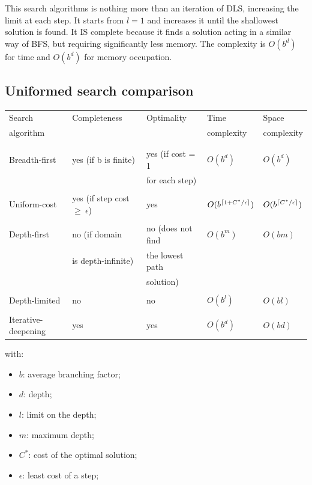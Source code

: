 \documentclass{article}
\DeclarePairedDelimiter\ceil{\lceil}{\rceil}
\begin{document}
This search algorithms is nothing more than an iteration of DLS, increasing the limit at each step. It starts from $l=1$ and increases it until the shallowest solution is found. It IS complete because it finds a solution acting in a similar way of BFS, but requiring significantly less memory. The complexity is $O(b^d)$ for time and $O(b^d)$ for memory occupation. 

\subsection{Uniformed search comparison}

\begin{center}
    \begin{table}[h]
        \begin{tabular}{l | l | l | l | l}
            Search & Completeness & Optimality & Time & Space \\
            algorithm & & & complexity & complexity \\
            & & & & \\
            \hline
            & & & & \\
            Breadth-first & yes (if b is finite) & yes (if cost = 1 & $O(b^d)$ & $O(b^d)$ \\
            & & for each step) & & \\
            & & & & \\
            Uniform-cost & yes (if step cost $\geq\ \epsilon$) & yes & $O(b^{\ceil{1 + C^*/\epsilon}})$ & $O(b^{\ceil{C^*/\epsilon}})$ \\
            & & & & \\
            Depth-first & no (if domain & no (does not find& $O(b^m)$ & $O(bm)$ \\
            & is depth-infinite) & the lowest path& & \\
            & & solution) & & \\
            & & & & \\
            Depth-limited & no & no & $O(b^l)$ & $O(bl)$ \\
            & & & & \\
            Iterative-deepening & yes & yes & $O(b^d)$ & $O(bd)$
        \end{tabular}
    \end{table}
\end{center}

\begin{flushleft}
    with:
\end{flushleft}
\begin{itemize}
    \item $b$: average branching factor;
    \item $d$: depth;
    \item $l$: limit on the depth;
    \item $m$: maximum depth;
    \item $C^*$: cost of the optimal solution;
    \item $\epsilon$: least cost of a step; 
\end{itemize}
\end{document}
